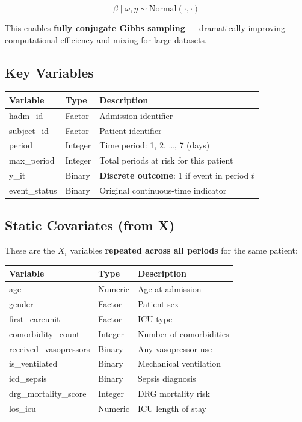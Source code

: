 \documentclass[11pt]{article}
\begin{document}
\[
\beta \mid \omega, y \sim \text{Normal}(\cdot, \cdot)
\]

This enables \textbf{fully conjugate Gibbs sampling} --- dramatically improving computational efficiency and mixing for large datasets.

\subsection{Key Variables}

\begin{longtable}{L{4cm}L{2cm}L{8cm}}
\toprule
\textbf{Variable} & \textbf{Type} & \textbf{Description} \\
\midrule
\endhead
hadm\_id & Factor & Admission identifier \\
subject\_id & Factor & Patient identifier \\
period & Integer & Time period: 1, 2, \ldots, 7 (days) \\
max\_period & Integer & Total periods at risk for this patient \\
y\_it & Binary & \textbf{Discrete outcome}: 1 if event in period $t$ \\
event\_status & Binary & Original continuous-time indicator \\
\bottomrule
\end{longtable}

\subsection{Static Covariates (from X)}

These are the $X_i$ variables \textbf{repeated across all periods} for the same patient:

\begin{longtable}{L{4cm}L{2cm}L{8cm}}
\toprule
\textbf{Variable} & \textbf{Type} & \textbf{Description} \\
\midrule
\endhead
age & Numeric & Age at admission \\
gender & Factor & Patient sex \\
first\_careunit & Factor & ICU type \\
comorbidity\_count & Integer & Number of comorbidities \\
received\_vasopressors & Binary & Any vasopressor use \\
is\_ventilated & Binary & Mechanical ventilation \\
icd\_sepsis & Binary & Sepsis diagnosis \\
drg\_mortality\_score & Integer & DRG mortality risk \\
los\_icu & Numeric & ICU length of stay \\
\bottomrule
\end{longtable}
\end{document}
